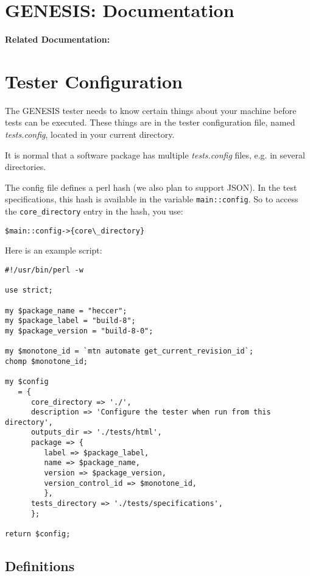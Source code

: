 \documentclass[12pt]{article}
\begin{document}
\section*{GENESIS: Documentation}

{\bf Related Documentation:}

\section*{Tester Configuration}

The GENESIS tester needs to know certain things about your machine before tests can be executed. These things are in the tester configuration file, named {\it tests.config}, located in your current directory.

It is normal that a software package has multiple {\it tests.config} files, e.g. in several directories.

The config file defines a perl hash (we also plan to support JSON). In the test specifications, this hash is available in the variable {\tt main::config}. So to access the {\tt core\_directory} entry in the hash, you use:
\begin{verbatim}
$main::config->{core\_directory}
\end{verbatim}

Here is an example script:
\begin{verbatim}
#!/usr/bin/perl -w

use strict;

my $package_name = "heccer";
my $package_label = "build-8";
my $package_version = "build-8-0";

my $monotone_id = `mtn automate get_current_revision_id`;
chomp $monotone_id;

my $config
   = {
      core_directory => './',
      description => 'Configure the tester when run from this directory',
      outputs_dir => './tests/html',
      package => {
         label => $package_label,
         name => $package_name,
         version => $package_version,
         version_control_id => $monotone_id,
         },
      tests_directory => './tests/specifications',
      };

return $config;
\end{verbatim}

\subsection*{Definitions}
\end{document}
